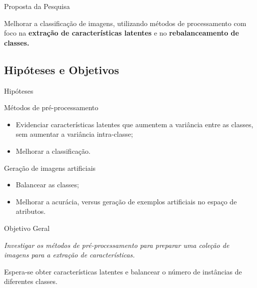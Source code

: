 \documentclass{beamer}
\begin{document}
\begin{frame}{Proposta da Pesquisa}
\begin{block}{}
\justifying
    Melhorar a classificação de imagens, utilizando métodos de processamento com foco na \textbf{extração de características latentes} e no \textbf{rebalanceamento de classes.}
\end{block}
\end{frame}
\subsection{Hipóteses e Objetivos}
\setlength\leftmargini{1em}
\justifying
 \begin{frame}{Hipóteses}
  \begin{block}{Métodos de pré-processamento}
    \justifying
    \begin{itemize}
      \item Evidenciar características latentes que aumentem a variância entre as classes, sem aumentar a variância intra-classe;
      \item Melhorar a classificação.
    \end{itemize}
  \end{block}
  \begin{block}{Geração de imagens artificiais}
    \justifying
    \begin{itemize}
      \item Balancear as classes;
      \item Melhorar a acurácia, versus geração de exemplos artificiais no espaço de atributos.
    \end{itemize}
  \end{block}
\end{frame}
\begin{frame}{Objetivo Geral}
\setlength\leftmargini{1em}
\justifying
  \begin{block}{}
  \justifying
  \emph{Investigar os métodos de pré-processamento para preparar uma coleção de imagens para a extração de características.}

  \vspace{5mm}
  Espera-se obter características latentes e balancear o número de instâncias de diferentes classes.
  \end{block}
\end{frame}
\end{document}
